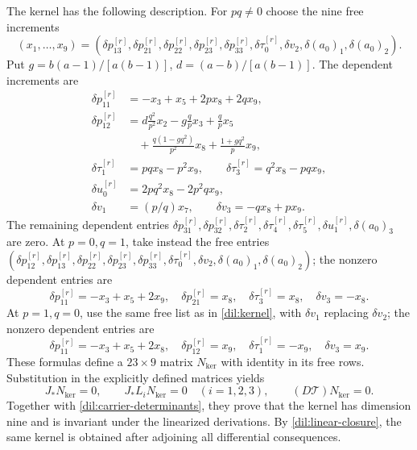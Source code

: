 \documentclass[11pt,a4paper]{article}
\numberwithin{equation}{section}
\theoremstyle{plain}
\theoremstyle{definition}
\theoremstyle{remark}
\begin{document}
The kernel has the following description.  For $pq\ne0$ choose the
nine free increments
\[
 (x_1,\ldots,x_9)
 = (\delta p_{13}^{[r]},\delta p_{21}^{[r]},\delta p_{22}^{[r]},
 \delta p_{23}^{[r]},\delta p_{33}^{[r]},\delta \tau_0^{[r]},
                   \delta v_2,\delta(a_0)_1,\delta(a_0)_2).
\]
Put $g=b(a-1)/[a(b-1)]$, $d=(a-b)/[a(b-1)]$.  The dependent
increments are
\begin{align}\label{dil:kernel}
 \delta p_{11}^{[r]}&=-x_3+x_5+2px_8+2qx_9,\\
 \delta p_{12}^{[r]}&=d\frac{q^2}{p^2}x_2-g\frac qp x_3
     +\frac qp x_5\nonumber\\
 &\quad+\frac{q(1-gq^2)}{p^2}x_8
     +\frac{1+gq^2}{p}x_9,\nonumber\\
 \delta \tau_1^{[r]}&=pqx_8-p^2x_9,\qquad
 \delta \tau_3^{[r]}=q^2x_8-pqx_9,\nonumber\\
 \delta u_0^{[r]}&=2pq^2x_8-2p^2qx_9,\nonumber\\
 \delta v_1&=(p/q)x_7,\qquad
 \delta v_3=-qx_8+px_9.\nonumber
\end{align}
The remaining dependent entries
$\delta p_{31}^{[r]},\delta p_{32}^{[r]},\delta \tau_2^{[r]},\delta \tau_4^{[r]},
\delta \tau_5^{[r]},\delta u_1^{[r]},\delta(a_0)_3$ are zero.
At $p=0,q=1$, take instead the free entries
$(\delta p_{12}^{[r]},\delta p_{13}^{[r]},\delta p_{22}^{[r]},
\delta p_{23}^{[r]},\delta p_{33}^{[r]},\delta \tau_0^{[r]},
\delta v_2,\delta(a_0)_1,\delta(a_0)_2)$; the nonzero dependent entries
are
\[
 \delta p_{11}^{[r]}=-x_3+x_5+2x_9,\quad
 \delta p_{21}^{[r]}=x_8,\quad\delta \tau_3^{[r]}=x_8,\quad
 \delta v_3=-x_8.
\]
At $p=1,q=0$, use the same free list as in
\eqref{dil:kernel}, with $\delta v_1$ replacing $\delta v_2$;
the nonzero dependent entries are
\[
 \delta p_{11}^{[r]}=-x_3+x_5+2x_8,\quad
 \delta p_{12}^{[r]}=x_9,\quad\delta \tau_1^{[r]}=-x_9,\quad
 \delta v_3=x_9.
\]
These formulas define a $23\times9$ matrix $N_{\mathrm{ker}}$ with identity in its
free rows.  Substitution in the explicitly defined matrices yields
\begin{equation}\label{dil:kernel-identities}
 J_*N_{\mathrm{ker}}=0,\qquad J_*L_iN_{\mathrm{ker}}=0\quad(i=1,2,3),\qquad
                         (D\mathcal T)N_{\mathrm{ker}}=0.
\end{equation}
Together with \eqref{dil:carrier-determinants}, they prove that the
kernel has dimension nine and is invariant under the linearized
derivations. By \eqref{dil:linear-closure}, the same kernel is obtained
after adjoining all differential consequences.
\end{document}
